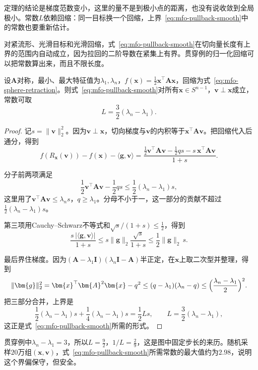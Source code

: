定理的结论是梯度范数变小，这里的量不是到极小点的距离，也没有说收敛到全局极小。常数$L$依赖回缩：同一目标换一个回缩，上界~\eqref{eq:mfo-pullback-smooth}中的常数也要重新估计。

对紧流形、光滑目标和光滑回缩，式~\eqref{eq:mfo-pullback-smooth}在切向量长度有上界的范围内自动成立，因为拉回的二阶导数在紧集上有界。贯穿例的归一化回缩可以把常数算出来，而且不限长度。

\begin{lemma}[球面Rayleigh商的光滑常数]
 \label{lem:mfo-sphere-l}
 设$\bm{A}$对称，最小、最大特征值为$\lambda_1,\lambda_n$，$f(\bm{x})=\tfrac12\bm{x}^\top\bm{A}\bm{x}$，回缩为式~\eqref{eq:mfo-sphere-retraction}。则式~\eqref{eq:mfo-pullback-smooth}对所有$\bm{x}\in S^{n-1}$，$\bm{v}\perp\bm{x}$成立，常数可取
 \begin{equation}
  L=\frac32(\lambda_n-\lambda_1).
  \label{eq:mfo-sphere-l}
 \end{equation}
\end{lemma}

\begin{proof}
 记$s=\lVert\bm{v}\rVert_2^2$。因为$\bm{v}\perp\bm{x}$，切向梯度与$\bm{v}$的内积等于$\bm{x}^\top\bm{A}\bm{v}$。把回缩代入后通分，得到
 \[
  f(R_{\bm{x}}(\bm{v}))-f(\bm{x})-\langle\bm{g},\bm{v}\rangle=\frac{\tfrac12\bm{v}^\top\bm{A}\bm{v}-\tfrac12qs-s\,\bm{x}^\top\bm{A}\bm{v}}{1+s}.
 \]

 分子前两项满足
 \[
  \frac12\bm{v}^\top\bm{A}\bm{v}-\frac12qs\leq\frac12(\lambda_n-\lambda_1)s,
 \]
 这里用了$\bm{v}^\top\bm{A}\bm{v}\leq\lambda_ns$，$q\geq\lambda_1$。分母不小于一，这一部分的贡献不超过$\tfrac12(\lambda_n-\lambda_1)s$。

 第三项用Cauchy--Schwarz不等式和$\sqrt{s}/(1+s)\leq\tfrac12$，得到
 \[
  \frac{s\,\lvert\langle\bm{g},\bm{v}\rangle\rvert}{1+s}\leq s\lVert\bm{g}\rVert_2\frac{\sqrt{s}}{1+s}\leq\frac12\lVert\bm{g}\rVert_2\,s.
 \]

 最后界住梯度。因为$(\bm{A}-\lambda_1\bm{I})(\lambda_n\bm{I}-\bm{A})$半正定，在$\bm{x}$上取二次型并整理，得到
 \[
  \lVert\bm{g}\rVert_2^2=\bm{x}^\top\bm{A}^2\bm{x}-q^2\leq(q-\lambda_1)(\lambda_n-q)\leq\Bigl(\frac{\lambda_n-\lambda_1}{2}\Bigr)^2.
 \]
 把三部分合并，上界是
 \[
  \frac12(\lambda_n-\lambda_1)s+\frac14(\lambda_n-\lambda_1)s=\frac12Ls,\qquad L=\frac32(\lambda_n-\lambda_1),
 \]
 这正是式~\eqref{eq:mfo-pullback-smooth}所需的形式。
\end{proof}

贯穿例中$\lambda_n-\lambda_1=3$，所以$L=\tfrac92$，$1/L=\tfrac29$，这是图中固定步长的来历。随机采样$20$万组$(\bm{x},\bm{v})$，式~\eqref{eq:mfo-pullback-smooth}所需常数的最大值约为$2.98$，说明这个界偏保守，但安全。

